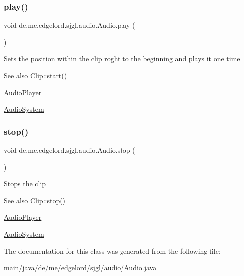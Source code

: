 \subsubsection{\texorpdfstring{play()}{play()}}
{\footnotesize\ttfamily void de.\+me.\+edgelord.\+sjgl.\+audio.\+Audio.\+play (\begin{DoxyParamCaption}{ }\end{DoxyParamCaption})}

Sets the position within the clip roght to the beginning and plays it one time

\begin{DoxySeeAlso}{See also}
Clip\+::start() 

\mbox{\hyperlink{classde_1_1me_1_1edgelord_1_1sjgl_1_1audio_1_1_audio_player}{Audio\+Player}} 

\mbox{\hyperlink{classde_1_1me_1_1edgelord_1_1sjgl_1_1audio_1_1_audio_system}{Audio\+System}} 
\end{DoxySeeAlso}
\mbox{\label{classde_1_1me_1_1edgelord_1_1sjgl_1_1audio_1_1_audio_a2e9d9c2e43c4bab399c7f360c8f90ce2}} 
\subsubsection{\texorpdfstring{stop()}{stop()}}
{\footnotesize\ttfamily void de.\+me.\+edgelord.\+sjgl.\+audio.\+Audio.\+stop (\begin{DoxyParamCaption}{ }\end{DoxyParamCaption})}

Stops the clip

\begin{DoxySeeAlso}{See also}
Clip\+::stop() 

\mbox{\hyperlink{classde_1_1me_1_1edgelord_1_1sjgl_1_1audio_1_1_audio_player}{Audio\+Player}} 

\mbox{\hyperlink{classde_1_1me_1_1edgelord_1_1sjgl_1_1audio_1_1_audio_system}{Audio\+System}} 
\end{DoxySeeAlso}


The documentation for this class was generated from the following file\+:\begin{DoxyCompactItemize}
\item 
main/java/de/me/edgelord/sjgl/audio/Audio.\+java\end{DoxyCompactItemize}
